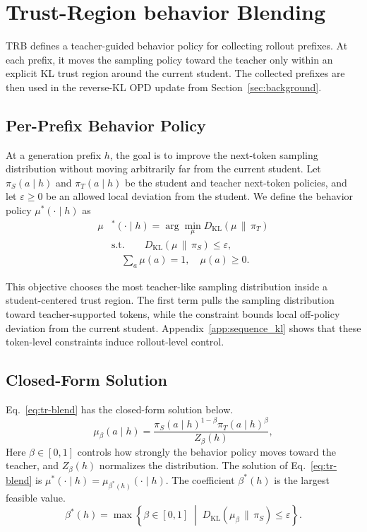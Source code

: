 \documentclass[11pt]{article}
\begin{document}
\section{Trust-Region behavior Blending}
\label{sec:method}

TRB defines a teacher-guided behavior policy for collecting rollout prefixes.
At each prefix, it moves the sampling policy toward the teacher only within an explicit KL trust region around the current student.
The collected prefixes are then used in the reverse-KL OPD update from Section~\ref{sec:background}.

\subsection{Per-Prefix Behavior Policy}

At a generation prefix $h$, the goal is to improve the next-token sampling distribution without moving arbitrarily far from the current student.
Let $\pi_S(a\mid h)$ and $\pi_T(a\mid h)$ be the student and teacher next-token policies, and let $\varepsilon\ge0$ be an allowed local deviation from the student.
We define the behavior policy $\mu^*(\cdot \mid h)$ as
\begin{equation}
\label{eq:tr-blend}
\begin{aligned}
\mu&^*(\cdot \mid h)= \arg\min_{\mu}
D_{\mathrm{KL}}(\mu \,\|\, \pi_T)\\
&\text{s.t.}\qquad
D_{\mathrm{KL}}(\mu \,\|\, \pi_S) \le \varepsilon,\\
&\quad \sum_a \mu(a) = 1,
\quad\mu(a) \ge 0.
\end{aligned}
\end{equation}

This objective chooses the most teacher-like sampling distribution inside a student-centered trust region.
The first term pulls the sampling distribution toward teacher-supported tokens, while the constraint bounds local off-policy deviation from the current student.
Appendix~\ref{app:sequence_kl} shows that these token-level constraints induce rollout-level control.

\subsection{Closed-Form Solution}

Eq.~\ref{eq:tr-blend} has the closed-form solution below.
\begin{equation}
\mu_\beta(a \mid h)
=
\frac{
\pi_S(a \mid h)^{1-\beta}
\pi_T(a \mid h)^\beta
}{
Z_\beta(h)
},
\label{eq:geom-family}
\end{equation}
Here $\beta \in [0,1]$ controls how strongly the behavior policy moves toward the teacher, and $Z_\beta(h)$ normalizes the distribution.
The solution of Eq.~\ref{eq:tr-blend} is $\mu^*(\cdot\mid h)=\mu_{\beta^*(h)}(\cdot\mid h)$.
The coefficient $\beta^*(h)$ is the largest feasible value.
\begin{equation*}
\beta^*(h)
=
\max
\left\{
\beta \in [0,1]
\;\middle|\;
D_{\mathrm{KL}}(\mu_\beta \,\|\, \pi_S) \le \varepsilon
\right\}.
\end{equation*}
\end{document}
